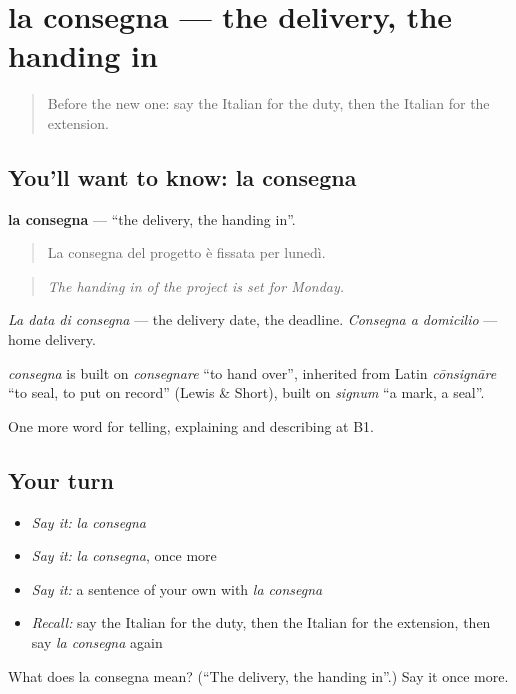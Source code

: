 \section[la consegna]{la consegna — the delivery, the handing in}

\label{lesson:IT-C360-consegna}



\begin{quote}
Before the new one: say the Italian for the duty, then the Italian for the extension.
\end{quote}

\subsection*{You'll want to know: la consegna}
\textbf{la consegna} — \textquotedblleft{}the delivery, the handing in\textquotedblright{}.

\begin{quote}
La consegna del progetto è fissata per lunedì.
\end{quote}

\begin{quote}
\emph{The handing in of the project is set for Monday.}
\end{quote}

\emph{La data di consegna} — the delivery date, the deadline. \emph{Consegna a domicilio} — home delivery.

\begin{cousinweb}
\emph{consegna} is built on \emph{consegnare} \textquotedblleft{}to hand over\textquotedblright{}, inherited from Latin \emph{cōnsignāre} \textquotedblleft{}to seal, to put on record\textquotedblright{} (Lewis \& Short), built on \emph{signum} \textquotedblleft{}a mark, a seal\textquotedblright{}.
\end{cousinweb}

\begin{grammarlens}[title={What you've built}]
One more word for telling, explaining and describing at B1.
\end{grammarlens}

\subsection*{Your turn}
\begin{itemize}
\raggedright
  \item \emph{Say it:} \emph{la consegna}
  \item \emph{Say it:} \emph{la consegna}, once more
  \item \emph{Say it:} a sentence of your own with \emph{la consegna}
  \item \emph{Recall:} say the Italian for the duty, then the Italian for the extension, then say \emph{la consegna} again
\end{itemize}

\begin{tcolorbox}[breakable,colback=teal!4,colframe=teal!35!black,title={Before you move on}]
What does la consegna mean? (\textquotedblleft{}The delivery, the handing in\textquotedblright{}.) Say it once more.
\end{tcolorbox}
